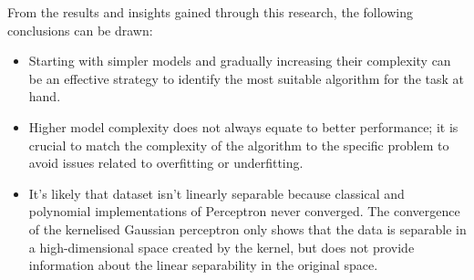 \documentclass[a4paper, 10pt]{article}
\begin{document}
From the results and insights gained through this research, the following conclusions can be drawn:
\begin{itemize}
    \item Starting with simpler models and gradually increasing their complexity can be an effective strategy to identify the most suitable algorithm for the task at hand.
    \item Higher model complexity does not always equate to better performance; it is crucial to match the complexity of the algorithm to the specific problem to avoid issues related to overfitting or underfitting.
    \item It's likely that dataset isn't linearly separable because classical and polynomial implementations of Perceptron never converged. The convergence of the kernelised Gaussian perceptron only shows that the data is separable in a high-dimensional space created by the kernel, but does not provide information about the linear separability in the original space.
\end{itemize}
\end{document}
